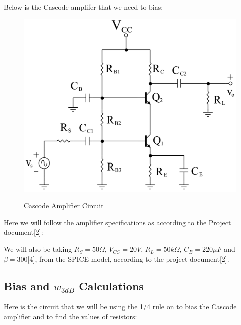 \documentclass[12pt]{article}
\begin{document}
Below is the Cascode amplifer that we need to bias: 
\begin{figure}[h!]
\centering
\includegraphics[height=0.25\textwidth]{Images/Part_1_circuit.png}\\
\caption{Cascode Amplifier Circuit}
\label{fig:part1_circuit}
\end{figure}

Here we will follow the amplifier specifications as according to the Project document[2]:

\begin{table}[h!]
\centering
{}

\caption{Cascode Amplifier Specifications}
\label{table_1}
\end{table}

We will also be taking $R_S=50\Omega$, $V_{CC} = 20V$, $R_L=50k\Omega$, $C_B= 220\mu F$ and $\beta = 300$[4], from the SPICE model, according to the project document[2]. 

\subsection{Bias and $w_{3dB}$ Calculations}
Here is the circuit that we will be using the 1/4 rule on to bias the Cascode amplifier and to find the values of resistors:
\end{document}
